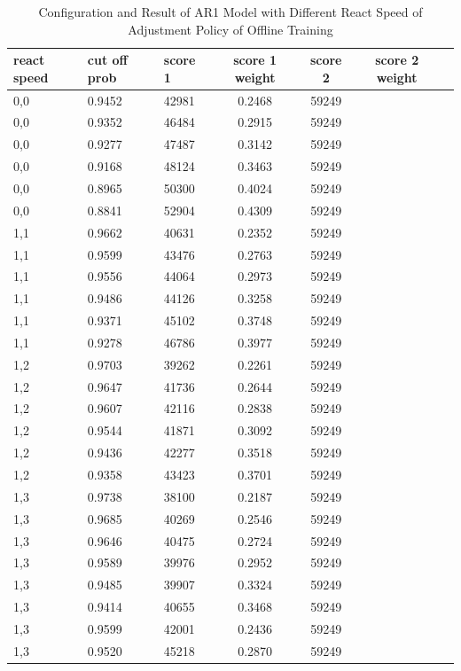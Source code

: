 \documentclass{article}
\begin{document}
\begin{longtable}[htbp]{l|l|l|*{4}{c}}
    \caption{Configuration and Result of AR1 Model with Different React Speed of Adjustment Policy of Offline Training}
    \label{tab:tab1.8.1} \\
    \textbf{react speed} & \textbf{cut off prob} & \textbf{score 1} &
    \textbf{score 1 weight} & \textbf{score 2} & \textbf{score 2 weight} \\
    \hline
    0,0 & 0.9452 & 42981 & 0.2468 & 59249\\
    0,0 & 0.9352 & 46484 & 0.2915 & 59249\\
    0,0 & 0.9277 & 47487 & 0.3142 & 59249\\
    0,0 & 0.9168 & 48124 & 0.3463 & 59249\\
    0,0 & 0.8965 & 50300 & 0.4024 & 59249\\
    0,0 & 0.8841 & 52904 & 0.4309 & 59249\\
    1,1 & 0.9662 & 40631 & 0.2352 & 59249\\
    1,1 & 0.9599 & 43476 & 0.2763 & 59249\\
    1,1 & 0.9556 & 44064 & 0.2973 & 59249\\
    1,1 & 0.9486 & 44126 & 0.3258 & 59249\\
    1,1 & 0.9371 & 45102 & 0.3748 & 59249\\
    1,1 & 0.9278 & 46786 & 0.3977 & 59249\\
    1,2 & 0.9703 & 39262 & 0.2261 & 59249\\
    1,2 & 0.9647 & 41736 & 0.2644 & 59249\\
    1,2 & 0.9607 & 42116 & 0.2838 & 59249\\
    1,2 & 0.9544 & 41871 & 0.3092 & 59249\\
    1,2 & 0.9436 & 42277 & 0.3518 & 59249\\
    1,2 & 0.9358 & 43423 & 0.3701 & 59249\\
    1,3 & 0.9738 & 38100 & 0.2187 & 59249\\
    1,3 & 0.9685 & 40269 & 0.2546 & 59249\\
    1,3 & 0.9646 & 40475 & 0.2724 & 59249\\
    1,3 & 0.9589 & 39976 & 0.2952 & 59249\\
    1,3 & 0.9485 & 39907 & 0.3324 & 59249\\
    1,3 & 0.9414 & 40655 & 0.3468 & 59249\\
    1,3 & 0.9599 & 42001 & 0.2436 & 59249\\
    1,3 & 0.9520 & 45218 & 0.2870 & 59249\\

\end{longtable}
\end{document}
